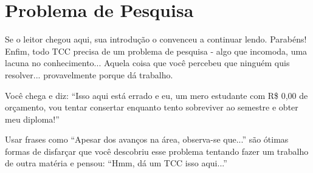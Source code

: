 \section{Problema de Pesquisa}
\label{problema}

Se o leitor chegou aqui, sua introdução o convenceu a continuar lendo. Parabéns! Enfim, todo TCC precisa de um problema de pesquisa - algo que incomoda, uma lacuna no conhecimento... Aquela coisa que você percebeu que ninguém quis resolver... provavelmente porque dá trabalho.

Você chega e diz: \enquote{Isso aqui está errado e eu, um mero estudante com R\$ 0,00 de orçamento, vou tentar consertar enquanto tento sobreviver ao semestre e obter meu diploma!}

Usar frases como \enquote{Apesar dos avanços na área, observa-se que...} são ótimas formas de disfarçar que você descobriu esse problema tentando fazer um trabalho de outra matéria e pensou: \enquote{Hmm, dá um TCC isso aqui...}